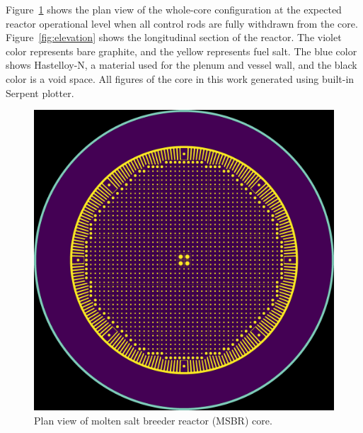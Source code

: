 \documentclass{anstrans}
\begin{document}
Figure~\ref{fig:plan} shows the plan view of the whole-core configuration at the expected reactor operational level when all control rods are fully withdrawn from the core.  Figure~\ref{fig:elevation} shows the longitudinal section of the reactor. The violet color represents bare graphite, and the yellow represents fuel salt. The blue color shows Hastelloy-N, a material used for the plenum and vessel wall, and the black color is a void space. All figures of the core in this work generated using built-in Serpent plotter.
\begin{figure}[ht] %
  \centering
  \includegraphics[width=\linewidth]{figure_2_1.png}
  \caption{Plan view of molten salt breeder reactor (MSBR) core.}
  \label{fig:plan}
\end{figure}
\end{document}
